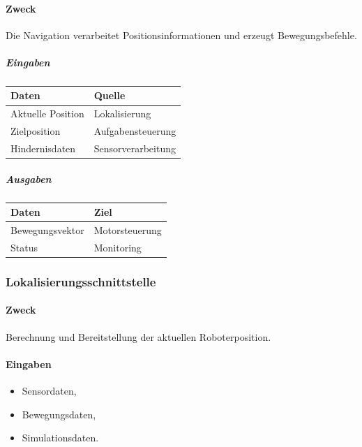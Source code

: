 \paragraph{Zweck}\label{zweck-7}

Die Navigation verarbeitet Positionsinformationen und erzeugt
Bewegungsbefehle.

\subparagraph{Eingaben}\label{eingaben-1}

\begin{longtable}[]{@{}ll@{}}
\toprule\noalign{}
Daten & Quelle \\
\midrule\noalign{}
\endhead
\bottomrule\noalign{}
\endlastfoot
Aktuelle Position & Lokalisierung \\
Zielposition & Aufgabensteuerung \\
Hindernisdaten & Sensorverarbeitung \\
\end{longtable}

\subparagraph{Ausgaben}\label{ausgaben-1}

\begin{longtable}[]{@{}ll@{}}
\toprule\noalign{}
Daten & Ziel \\
\midrule\noalign{}
\endhead
\bottomrule\noalign{}
\endlastfoot
Bewegungsvektor & Motorsteuerung \\
Status & Monitoring \\
\end{longtable}

\subsubsection{Lokalisierungsschnittstelle}\label{lokalisierungsschnittstelle}

\paragraph{Zweck}\label{zweck-8}

Berechnung und Bereitstellung der aktuellen Roboterposition.

\paragraph{Eingaben}\label{eingaben-2}

\begin{itemize}
\tightlist
\item
  Sensordaten,
\item
  Bewegungsdaten,
\item
  Simulationsdaten.
\end{itemize}

